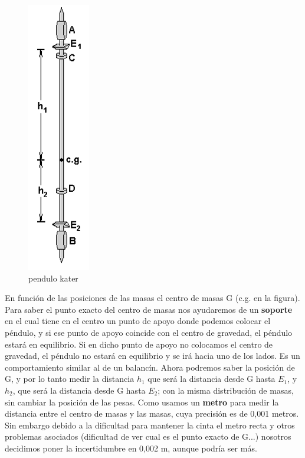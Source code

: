 \documentclass[12pt,a4paper]{book}
\begin{document}
\begin{figure}
\centering
\includegraphics[scale=0.5]{kater-dibujo1.png}
\caption{pendulo kater}
\label{Fig:kater-pendulo}
\end{figure}

En función de las posiciones de las masas el centro de masas G (c.g. en la figura). Para saber el punto exacto del centro de masas nos ayudaremos de un \textbf{soporte} en el cual tiene en el centro un punto de apoyo donde podemos colocar el péndulo, y si ese punto de apoyo coincide con el centro de gravedad, el péndulo estará en equilibrio. Si en dicho punto de apoyo no colocamos el centro de gravedad, el péndulo no estará en equilibrio y se irá hacia uno de los lados. Es un comportamiento similar al de un balancín. Ahora podremos saber la posición de G, y por lo tanto medir la distancia $h_1$ que será la distancia desde G hasta $E_1$, y $h_2$, que será la distancia desde G hasta $E_2$; con la misma distribución de masas, sin cambiar la posición de las pesas. Como usamos un \textbf{metro} para medir la distancia entre el centro de masas y las masas, cuya precisión es de 0,001 metros. Sin embargo debido a la dificultad para mantener la cinta el metro recta y otros problemas asociados (dificultad de ver cual es el punto exacto de G...) nosotros decidimos poner la incertidumbre en 0,002 m, aunque podría ser más. \\
\end{document}
